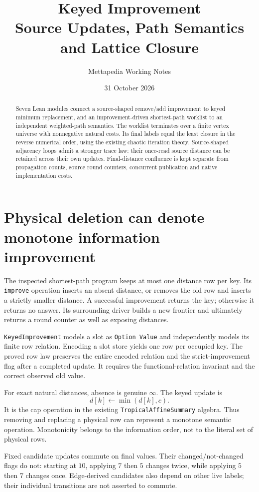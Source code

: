 \documentclass[11pt,a4paper]{article}
\title{Keyed Improvement\\
  \large Source Updates, Path Semantics and Lattice Closure}
\author{Mettapedia Working Notes}
\date{31 October 2026}
\newcommand{\code}[1]{\nolinkurl{#1}}
\begin{document}
\maketitle

\begin{abstract}
Seven Lean modules connect a source-shaped remove/add improvement to keyed
minimum replacement, and an improvement-driven shortest-path worklist to an
independent weighted-path semantics. The worklist terminates over a finite
vertex universe with nonnegative natural costs. Its final labels equal the
least closure in the reverse numerical order, using the existing chaotic
iteration theory. Source-shaped adjacency loops admit a stronger trace law:
their once-read source distance can be retained across their own updates.
Final-distance confluence is kept separate from propagation counts, source
round counters, concurrent publication and native implementation costs.
\end{abstract}

\section{Physical deletion can denote monotone information improvement}

The inspected shortest-path program keeps at most one distance row per key.
Its \code{improve} operation inserts an absent distance, or removes the old
row and inserts a strictly smaller distance. A successful improvement returns
the key; otherwise it returns no answer. Its surrounding driver builds a new
frontier and ultimately returns a round counter as well as exposing distances.

\code{KeyedImprovement} models a slot as \code{Option Value} and independently
models its finite row relation. Encoding a slot store yields one row per
occupied key. The proved row law preserves the entire encoded relation and
the strict-improvement flag after a completed update. It requires the
functional-relation invariant and the correct observed old value.

For exact natural distances, absence is genuine $\infty$. The keyed update is
\[
  d[k]\gets\min(d[k],c).
\]
It is the cap operation in the existing \code{TropicalAffineSummary} algebra.
Thus removing and replacing a physical row can represent a monotone semantic
operation. Monotonicity belongs to the information order, not to the literal
set of physical rows.

Fixed candidate updates commute on final values. Their changed/not-changed
flags do not: starting at $10$, applying $7$ then $5$ changes twice, while
applying $5$ then $7$ changes once. Edge-derived candidates also depend on
other live labels; their individual transitions are not asserted to commute.
\end{document}
